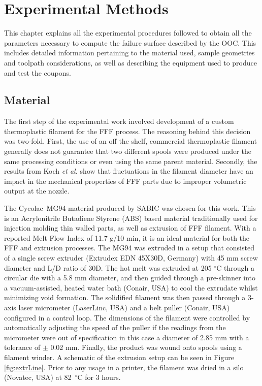 \documentclass[main.tex]{subfiles}
\begin{document}
\chapter{Experimental Methods} \label{ch:exp}
This chapter explains all the experimental procedures followed to obtain all the parameters necessary to compute the failure surface described by the OOC. This includes detailed information pertaining to the material used, sample geometries and toolpath considerations, as well as describing the equipment used to produce and test the coupons.   

\section{Material} \label{sec:material}

The first step of the experimental work involved development of a custom thermoplastic filament for the FFF process. The reasoning behind this decision was two-fold. First, the use of an off the shelf, commercial thermoplastic filament generally does not guarantee that two different spools were produced under the same processing conditions \textemdash or even using the same parent material. Secondly, the results from Koch \emph{et al.} \cite{Koch2017} show that fluctuations in the filament diameter have an impact in the mechanical properties of FFF parts due to improper volumetric output at the nozzle.

The Cycolac\textregistered~MG94 material produced by SABIC was chosen for this work. This is an Acrylonitrile Butadiene Styrene (ABS) based material traditionally used for injection molding thin walled parts, as well as extrusion of FFF filament. With a reported Melt Flow Index of 11.7 g/10 min, it is an ideal material for both the FFF and extrusion processes. The MG94 was extruded in a setup that consisted of a single screw extruder (Extrudex EDN 45X30D, Germany) with 45 mm screw diameter and L/D ratio of 30D. The hot melt was extruded at 205 $^\circ$C through a circular die with a 5.8 mm diameter, and then guided through a pre-skinner into a vacuum-assisted, heated water bath (Conair, USA) to cool the extrudate whilst minimizing void formation. The solidified filament was then passed through a 3-axis laser micrometer (LaserLinc, USA) and a belt puller (Conair, USA) configured in a control loop. The dimensions of the filament were controlled by automatically adjusting the speed of the puller if the readings from the micrometer were out of specification \textemdash in this case a diameter of 2.85 mm with a tolerance of $\pm$ 0.02 mm. Finally, the product was wound onto spools using a filament winder. A schematic of the extrusion setup can be seen in Figure \ref{fig:extrLine}. Prior to any usage in a printer, the filament was dried in a silo (Novatec, USA) at 82~$^\circ$C for 3 hours.
\end{document}

